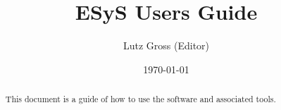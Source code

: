 \documentclass{manual}
\title{ESyS Users Guide}
\author{Lutz Gross (Editor)}
\date{\today}
\begin{document}
\maketitle



\begin{abstract}
This document is a guide of how to use the \ESyS software and
associated tools.
\end{abstract}

\tableofcontents



%



\makemodindex

\printindex
%
\end{document}
